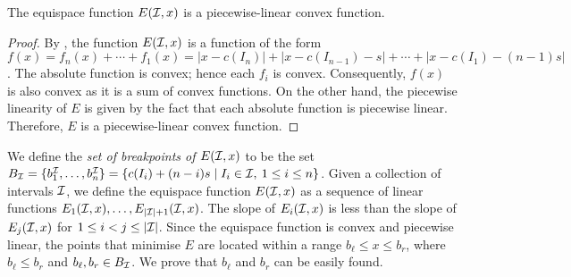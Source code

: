 \begin{mlemmarep}\label{lem:tmd_convex}
    The equispace function $E(\mathcal{I},x)$ is a piecewise-linear convex function.
\end{mlemmarep}
\begin{proof}
    By , the function $E(\mathcal{I},x)$ is a function of the form $f(x) = f_n(x)+\cdots+ f_1(x) = |x - c(I_n)| + |x - c(I_{n-1}) - s| + \cdots + |x - c(I_1) - (n-1)s|$. 
    The absolute function is convex; hence each $f_i$ is convex.
    Consequently, $f(x)$ is also convex as it is a sum of convex functions.
    On the other hand, the piecewise linearity of $E$ is given by the fact that each absolute function is piecewise linear.
    Therefore, $E$ is a piecewise-linear convex function.
\end{proof}

We define the \emph{set of breakpoints of $E(\mathcal{I},x)$} to be the set $B_{\mathcal{I}} =\{b_1^{\mathcal{I}},\ldots,b_n^{\mathcal{I}}\} = \{c(I_i) + (n-i)s\mid I_i \in \mathcal{I},\: 1\le i\le n\}$.
Given a collection of intervals $\mathcal{I}$, we define the equispace function $E(\mathcal{I}, x)$ as a sequence of linear functions $E_1(\mathcal{I}, x), \ldots, E_{|\mathcal{I}|+1}(\mathcal{I}, x)$. 
The slope of $E_i(\mathcal{I}, x)$ is less than the slope of $E_j(\mathcal{I}, x)$ for $1 \le i < j \le |\mathcal{I}|$.
Since the equispace function is convex and piecewise linear, the points that minimise $E$ are located within a range $b_\ell \leq x \leq b_r$, where $b_{\ell} \le b_r$ and $b_\ell, b_r \in B_{\mathcal{I}}$.
We prove that $b_\ell$ and $b_r$ can be easily found.

